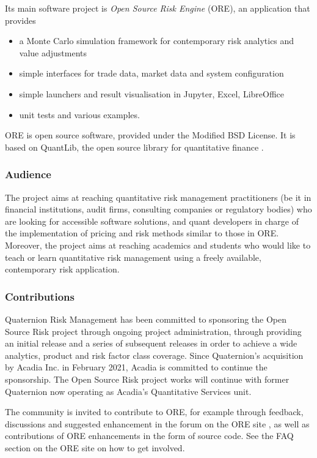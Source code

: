\documentclass[12pt, a4paper]{article}
\begin{document}
Its main software project is {\em Open Source Risk Engine} (ORE), an application that provides
\begin{itemize}
\item a Monte Carlo simulation framework for contemporary risk analytics and value adjustments
\item simple interfaces for trade data, market data and system configuration
\item simple launchers and result visualisation in Jupyter, Excel, LibreOffice
\item unit tests and various examples.  
\end{itemize}
ORE is open source software, provided under the Modified BSD License. It is based 
on QuantLib, the open source library for quantitative finance \cite{QL}.

\subsubsection*{Audience}
The project aims at reaching quantitative risk ma\-nage\-ment practitioners (be it in financial institutions, audit
firms, consulting companies or regulatory bodies) who are looking for accessible software solutions, and quant
developers in charge of the implementation of pricing and risk methods similar to those in ORE. Moreover, the project
aims at reaching academics and students who would like to teach or learn quantitative risk management using a freely
available, contemporary risk application.

\subsubsection*{Contributions}
Quaternion Risk Management \cite{QRM} has been committed to sponsoring the Open Source Risk project through ongoing project
administration, through providing an initial release and a series of subsequent releases in order to achieve a wide
analytics, product and risk factor class coverage. Since Quaternion's acquisition by Acadia Inc. in February 2021, Acadia \cite{acadia} is committed to continue the sponsorship. The Open Source Risk project works will continue with former Quaternion now operating as Acadia's Quantitative Services unit. 

The community is invited to contribute to ORE, for example through
feedback, discussions and suggested enhancement in the forum on the ORE site \cite{ORE}, as well as contributions of ORE
enhancements in the form of source code. See the FAQ section on the ORE site \cite{ORE} on how to get involved.
\end{document}

